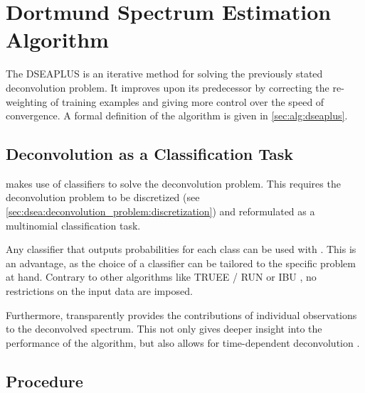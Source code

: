 \section{Dortmund Spectrum Estimation Algorithm} \label{sec:dsea:dsea}
The \acf{DSEAPLUS} \cite{dsea_unification}
is an iterative method for solving the previously stated deconvolution problem.
It improves upon its predecessor \dseanonplus{} \cite{dsea_tim} by
  correcting the re-weighting of training examples and
  giving more control over the speed of convergence.
%
A formal definition of the \dseaplus{} algorithm is given in \autoref{sec:alg:dseaplus}.


\subsection{Deconvolution as a Classification Task} %
\dsea{} makes use of classifiers to solve the deconvolution problem.
This requires the deconvolution problem to be
  discretized (see \autoref{sec:dsea:deconvolution_problem:discretization})
  and reformulated as a multinomial classification task.

Any classifier that outputs probabilities for each class
  can be used with \dsea{}.
This is an advantage,
  as the choice of a classifier can be tailored to the specific problem at hand.
Contrary to other algorithms like
  \ac{TRUEE} / \ac{RUN} \cite{milke2013} or
  \ac{IBU} \cite{dagostini1995, dagostini2010},
no restrictions on the input data are imposed.

Furthermore,
\dsea{} transparently provides the contributions of individual observations to the deconvolved spectrum.
This not only gives deeper insight into the performance of the algorithm,
but also allows for time-dependent deconvolution \cite{dsea_mirko}. %


\clearpage %
\subsection{Procedure}



